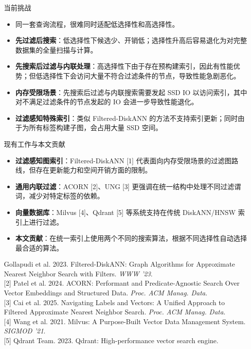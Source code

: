 \documentclass[aspectratio=169]{xmu-slide}
\begin{document}
\begin{frame}[t]{当前挑战}
    \small
    \begin{itemize}
        \item 同一套查询流程，很难同时适配低选择性和高选择性。
        \item \textbf{先过滤后搜索}：低选择性下候选少、开销低；选择性升高后容易退化为对完整数据集的全量扫描与计算。
        \item \textbf{先搜索后过滤与内联处理}：高选择性下由于存在预构建索引，因此有性能优势；但低选择性下会访问大量不符合过滤条件的节点，导致性能急剧恶化。
        \item \textbf{内存受限场景}：先搜索后过滤与内联搜索需要发起 SSD IO 以访问索引，其中对不满足过滤条件的节点发起的 IO 会进一步导致性能退化。
        \item \textbf{过滤感知特殊索引}：类似 Filtered-DiskANN 的方法不支持索引更新；同时由于为所有标签构建子图，会占用大量 SSD 空间。
    \end{itemize}
\end{frame}

\begin{frame}[t]{现有工作与本文贡献}
    \small
    \begin{itemize}
        \setlength{\itemsep}{0.2em}
        \item \textbf{过滤感知图索引}：Filtered-DiskANN [1] 代表面向内存受限场景的过滤图路线，但存在更新能力和空间开销方面的限制。
        \item \textbf{通用内联过滤}：ACORN [2]、UNG [3] 更强调在统一结构中处理不同过滤谓词，减少对特定标签的依赖。
        \item \textbf{向量数据库}：Milvus [4]、Qdrant [5] 等系统支持在传统 DiskANN/HNSW 索引上进行过滤。
        \item \textbf{本文贡献}：在统一索引上使用两个不同的搜索算法，根据不同选择性自动选择最合适的算法。
    \end{itemize}
    \vspace*{\fill}
    \fontsize{3.8}{4.2}\selectfont
    [1] Gollapudi et al. 2023. Filtered-DiskANN: Graph Algorithms for Approximate Nearest Neighbor Search with Filters. \textit{WWW '23}.\\[0.25em]
    [2] Patel et al. 2024. ACORN: Performant and Predicate-Agnostic Search Over Vector Embeddings and Structured Data. \textit{Proc. ACM Manag. Data}.\\[0.25em]
    [3] Cai et al. 2025. Navigating Labels and Vectors: A Unified Approach to Filtered Approximate Nearest Neighbor Search. \textit{Proc. ACM Manag. Data}.\\[0.25em]
    [4] Wang et al. 2021. Milvus: A Purpose-Built Vector Data Management System. \textit{SIGMOD '21}.\\[0.25em]
    [5] Qdrant Team. 2023. Qdrant: High-performance vector search engine.
\end{frame}
\end{document}
